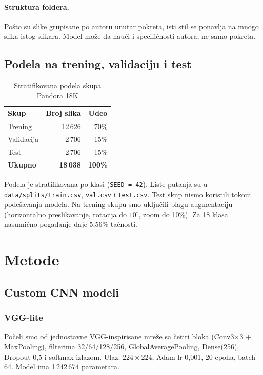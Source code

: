 \documentclass[12pt,a4paper]{article}
\begin{document}
\paragraph{Struktura foldera.}
Pošto su slike grupisane po autoru unutar pokreta, isti stil se ponavlja na mnogo slika istog slikara.
Model može da nauči i specifičnosti autora, ne samo pokreta.

\subsection{Podela na trening, validaciju i test}

\begin{table}[htbp]
  \centering
  \caption{Stratifikovana podela skupa Pandora 18K}
  \label{tab:split}
  \begin{tabular}{lrr}
    \toprule
    Skup & Broj slika & Udeo \\
    \midrule
    Trening    & 12\,626 & 70\% \\
    Validacija &  2\,706 & 15\% \\
    Test       &  2\,706 & 15\% \\
    \midrule
    \textbf{Ukupno} & \textbf{18\,038} & \textbf{100\%} \\
    \bottomrule
  \end{tabular}
\end{table}

Podela je stratifikovana po klasi (\texttt{SEED = 42}).
Liste putanja su u \texttt{data/splits/train.csv}, \texttt{val.csv} i \texttt{test.csv}.
Test skup nismo koristili tokom podešavanja modela.
Na trening skupu smo uključili blagu augmentaciju (horizontalno preslikavanje, rotacija do $10^\circ$, zoom do 10\%).
Za 18 klasa nasumično pogađanje daje 5{,}56\% tačnosti.

\section{Metode}

\subsection{Custom CNN modeli}

\subsubsection{VGG-lite}
Počeli smo od jednostavne VGG-inspirisane mreže sa četiri bloka (Conv3$\times$3 + MaxPooling),
filterima 32/64/128/256, GlobalAveragePooling, Dense(256), Dropout 0{,}5 i softmax izlazom.
Ulaz: $224\times 224$, Adam lr 0{,}001, 20 epoha, batch 64. Model ima 1\,242\,674 parametara.
\end{document}

